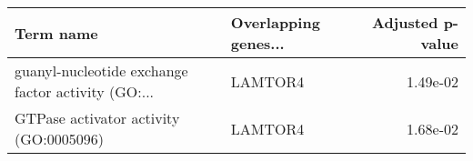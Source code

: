 \begin{tabular}{llr}
\toprule
                                         Term name & Overlapping genes... &  Adjusted p-value \\
\midrule
guanyl-nucleotide exchange factor activity (GO:... &              LAMTOR4 &          1.49e-02 \\
            GTPase activator activity (GO:0005096) &              LAMTOR4 &          1.68e-02 \\
\bottomrule
\end{tabular}
